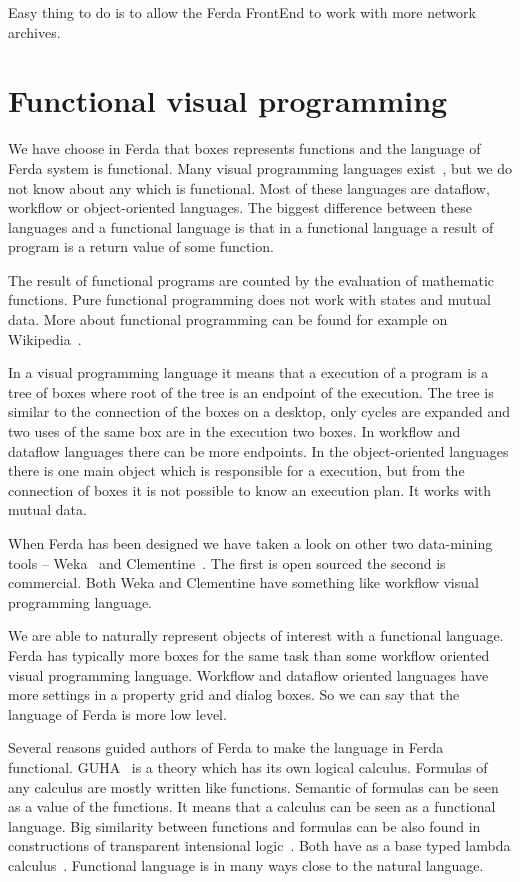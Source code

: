 \documentclass[a4paper,12pt]{book}
\begin{document}
Easy thing to do is to allow the Ferda FrontEnd to work with more network archives.

\section{Functional visual programming}
We have choose in Ferda that boxes represents functions and the language of Ferda system is functional. Many visual programming languages exist~\cite{WikiVisualProgrammingLaguage}, but we do not know about any which is functional. Most of these languages are dataflow, workflow or object-oriented languages. The biggest difference between these languages and a functional language is that in a functional language a result of program is a return value of some function.

The result of functional programs are counted by the evaluation of mathematic functions. Pure functional programming does not work with states and mutual data. More about functional programming can be found for example on Wikipedia~\cite{WikiFunctionalProgramming}.

In a visual programming language it means that a execution of a program is a tree of boxes where root of the tree is an endpoint of the execution. The tree is similar to the connection of the boxes on a desktop, only cycles are expanded and two uses of the same box are in the execution two boxes. In workflow and dataflow languages there can be more endpoints. In the object-oriented languages there is one main object which is responsible for a execution, but from the connection of boxes it is not possible to know an execution plan. It works with mutual data.

When Ferda has been designed we have taken a look on other two data-mining tools -- Weka~\cite{WebWeka} and Clementine~\cite{WebClementine}. The first is open sourced the second is commercial. Both Weka and Clementine have something like workflow visual programming language.

We are able to naturally represent objects of interest with a functional language. Ferda has typically more boxes for the same task than some workflow oriented visual programming language. Workflow and dataflow oriented languages have more settings in a property grid and dialog boxes. So we can say that the language of Ferda is more low level.

Several reasons guided authors of Ferda to make the language in Ferda functional. GUHA~\cite{GUHAbook} is a theory which has its own logical calculus. Formulas of any calculus are mostly written like functions. Semantic of formulas can be seen as a value of the functions. It means that a calculus can be seen as a functional language. Big similarity between functions and formulas can be also found in constructions of transparent intensional logic~\cite{webTIL}. Both have as a base typed lambda calculus~\cite{WikiLambdaCalculus}. Functional language is in many ways close to the natural language. 
\end{document}
